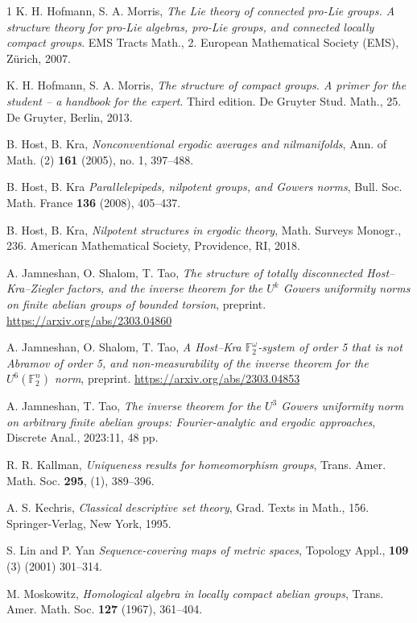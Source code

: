 \documentclass[a4paper,12pt,reqno]{amsart}
\theoremstyle{definition}
\newcommand{\mb}{\mathbb}
\begin{document}
\begin{thebibliography}{1}
 K. H. Hofmann,  S. A. Morris, \emph{The Lie theory of connected pro-Lie groups. A structure theory for pro-Lie algebras, pro-Lie groups, and connected locally compact groups}. EMS Tracts Math., 2. European Mathematical Society (EMS), Z\" urich, 2007.


 K. H. Hofmann,  S. A. Morris, \emph{The structure of compact groups. A primer for the student -- a handbook for the expert}. Third edition. De Gruyter Stud. Math., 25. De Gruyter, Berlin, 2013.


 B. Host, B. Kra, \emph{Nonconventional ergodic averages and nilmanifolds}, Ann. of Math. (2) \textbf{161} (2005), no. 1, 397--488.

 B. Host, B. Kra \emph{Parallelepipeds, nilpotent groups, and Gowers norms}, Bull. Soc. Math. France \textbf{136} (2008), 405--437.

 B. Host, B. Kra, \emph{Nilpotent structures in ergodic theory}, Math. Surveys Monogr., 236. American Mathematical Society, Providence, RI, 2018. 

 A. Jamneshan, O. Shalom, T. Tao, \emph{The structure of totally disconnected Host–Kra–Ziegler factors, and the inverse theorem for the $U^k$  Gowers uniformity norms on
finite abelian groups of bounded torsion}, preprint. \url{https://arxiv.org/abs/2303.04860}

 A. Jamneshan, O. Shalom, T. Tao, \emph{A Host–Kra $\mb{F}_2^\omega$-system of order 5 that is not Abramov of order 5, and non-measurability of the inverse theorem for the $U^6(\mb{F}_2^n)$ norm}, preprint. \url{https://arxiv.org/abs/2303.04853}

 A. Jamneshan, T. Tao, \emph{The inverse theorem for the $U^3$ Gowers uniformity norm on arbitrary finite abelian groups: Fourier-analytic and ergodic approaches}, Discrete Anal., 2023:11, 48 pp.

 R. R. Kallman, \emph{Uniqueness results for homeomorphism groups}, Trans. Amer. Math. Soc. \textbf{295}, (1), 389--396. 

 A. S. Kechris, \emph{Classical descriptive set theory}, Grad. Texts in Math., 156. Springer-Verlag, New York, 1995.

 S. Lin and P. Yan \emph{Sequence-covering maps of metric spaces}, Topology Appl., \textbf{109} (3) (2001) 301--314.

 M. Moskowitz, \emph{Homological algebra in locally compact abelian groups}, Trans. Amer. Math. Soc. \textbf{127} (1967), 361--404.


\end{thebibliography}
\end{document}
